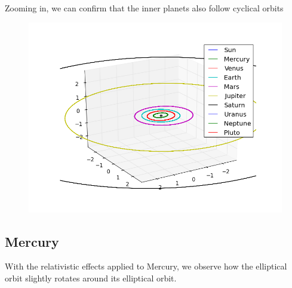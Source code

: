 \documentclass[10pt]{article}
\begin{document}
\begin{multicols}{2}
Zooming in, we can confirm that the inner planets also follow cyclical
orbits


\begin{figure}[H]
    \centering
    \includegraphics[width=1.0\linewidth]{../results/full_system_inner.png}
    \label{fig:name}
\end{figure}





\subsection{Mercury}
With the relativistic effects applied to Mercury, we observe how the
elliptical orbit slightly rotates around its elliptical orbit. 


\end{multicols}
\end{document}
